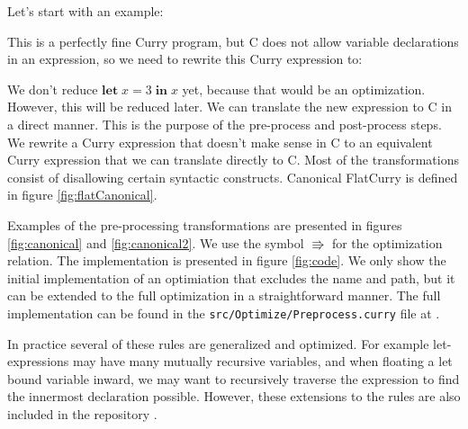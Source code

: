 \documentclass{book}
\theoremstyle{definition}
\newcommand{\Varid}[1]{\mathit{#1}}
\def\resethooks{%
  \global\let\SaveRestoreHook\empty
  \global\let\ColumnHook\empty}
\let\hspre\empty
\let\hspost\empty
\begin{document}
Let's start with an example:\begin{hscode}\SaveRestoreHook
\column{B}{@{}>{\hspre}l<{\hspost}@{}}%
\column{3}{@{}>{\hspre}l<{\hspost}@{}}%
\column{E}{@{}>{\hspre}l<{\hspost}@{}}%
\>[3]{}\mathbin{+}\;\Varid{x}\mathrel{=}\;\;\Varid{x}{}\<[E]%
\ColumnHook
\end{hscode}\resethooks
This is a perfectly fine Curry program, 
but C does not allow variable declarations in an expression,
so we need to rewrite this Curry expression to:\begin{hscode}\SaveRestoreHook
\column{B}{@{}>{\hspre}l<{\hspost}@{}}%
\column{3}{@{}>{\hspre}l<{\hspost}@{}}%
\column{E}{@{}>{\hspre}l<{\hspost}@{}}%
\>[3]{}\;\Varid{x}\mathrel{=}\;\;\mathbin{+}\Varid{x}{}\<[E]%
\ColumnHook
\end{hscode}\resethooks
We don't reduce \ensuremath{\mathbf{let}\;\Varid{x}\mathrel{=}\mathrm{3}\;\mathbf{in}\;\Varid{x}} yet, because that would be an optimization.
However, this will be reduced later.
We can translate the new expression to C in a direct manner.
This is the purpose of the pre-process and post-process steps.
We rewrite a Curry expression that doesn't make sense in C to an equivalent Curry expression
that we can translate directly to C.
Most of the transformations consist of disallowing certain syntactic constructs.
Canonical FlatCurry is defined in figure \ref{fig:flatCanonical}.

Examples of the pre-processing transformations are presented in figures
\ref{fig:canonical} and \ref{fig:canonical2}.
We use the symbol \ensuremath{\Rrightarrow } for the optimization relation.
The implementation is presented in figure \ref{fig:code}.
We only show the initial implementation of an optimiation
that excludes the name and path, but it can be extended to the full optimization
in a straightforward manner.
The full implementation can be found in 
the \texttt{src/Optimize/Preprocess.curry} file at \cite{git}.

In practice several of these rules are generalized and optimized.
For example let-expressions may have many mutually recursive variables,
and when floating a let bound variable inward, we may want to recursively traverse
the expression to find the innermost declaration possible.
However, these extensions to the rules are also included in the repository \cite{git}.
\end{document}
